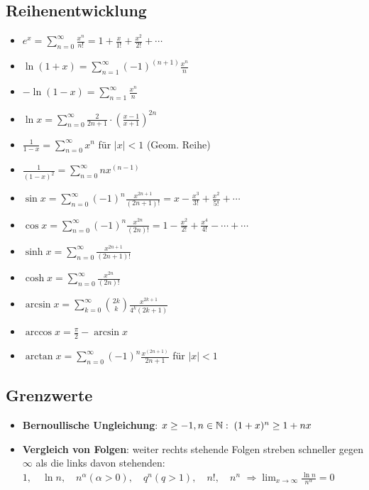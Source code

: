 \subsection{Reihenentwicklung}
\begin{itemize}[leftmargin=*]
	\item $e^x = \sum_{n=0}^\infty \frac{x^n}{n!} = 1 + \frac{x}{1!} +
	\frac{x^2}{2!} + \cdots$
	\item $\ln(1 + x) = \sum_{n=1}^\infty  (-1)^{(n+1)} \frac{x^n}{n} $
	\item $-\ln(1 - x) = \sum_{n=1}^\infty  \frac{x^n}{n} $
	\item $\ln x = \sum_{n=0}^\infty \frac{2}{2n + 1} \cdot \left(
	\frac{x-1}{x+1} \right)^{2n}$

	\item $\frac{1}{1-x} = \sum_{n=0}^\infty x^{n}$ für $|x|<1$ (Geom. Reihe)
	\item $\frac{1}{(1-x)^2} = \sum_{n=0}^\infty nx^{(n-1)}$

	\item $\sin x = \sum_{n=0}^\infty (-1)^n \frac{x^{2n + 1}}{(2n + 1)!} = x -
	\frac{x^3}{3!} + \frac{x^2}{5!} + \cdots$
	\item $\cos x = \sum_{n=0}^\infty (-1)^n \frac{x^{2n}}{(2n)!} = 1 -
	\frac{x^2}{2!} + \frac{x^4}{4!} - \cdots + \cdots$
	\item $\sinh x = \sum_{n=0}^\infty \frac{x^{2n+1}}{(2n + 1)!}$
	\item $\cosh x = \sum_{n=0}^\infty \frac{x^{2n}}{(2n)!}$
	\item $\arcsin x =  \sum_{k=0}^{\infty} \binom{2k}{k} \frac{x^{2k+1}}{4^{k}(2k+1)}$
	\item $\arccos x = \frac{\pi}{2} - \arcsin x$
	\item $\arctan x = \sum_{n=0}^\infty (-1)^n \frac{x^{(2n+1)}}{2n+1}$ für $|x|<1$
\end{itemize}

\subsection{Grenzwerte}
\begin{itemize}[leftmargin=*]
	\item \textbf{Bernoullische Ungleichung}: $x \geq -1, n \in \mathbb{N}: \; (1+x)^n \geq
	1+nx$
	\item \textbf{Vergleich von Folgen}: weiter rechts stehende Folgen streben
	schneller gegen $\infty$ als die links davon stehenden: $1, \quad \ln n, \quad
	n^\alpha (\alpha > 0), \quad q^n (q > 1), \quad n!, \quad n^n$ $\Rightarrow
	\lim_{x \to \infty} \frac{\ln n}{n^\alpha} = 0$
\end{itemize}
